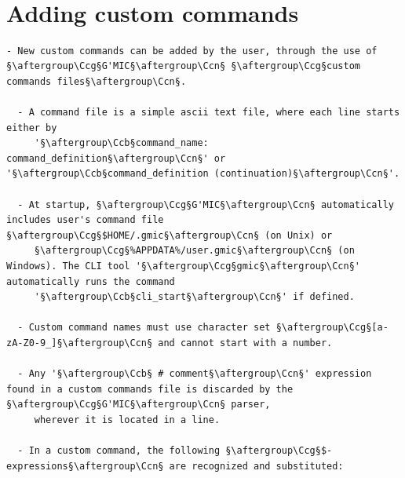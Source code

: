 \documentclass[a4paper,10.5pt,twoside]{book}
\def\Ccb{\color{cb}}
\def\Ccg{\color{cc}}
\def\Ccn{\color{black}}
\begin{document}
\normalsize
~\\\section{Adding custom commands}
\small
\begin{lstlisting}[escapechar=§]
  - New custom commands can be added by the user, through the use of §\aftergroup\Ccg§G'MIC§\aftergroup\Ccn§ §\aftergroup\Ccg§custom commands files§\aftergroup\Ccn§. 
 
  - A command file is a simple ascii text file, where each line starts either by 
     '§\aftergroup\Ccb§command_name: command_definition§\aftergroup\Ccn§' or '§\aftergroup\Ccb§command_definition (continuation)§\aftergroup\Ccn§'. 
 
  - At startup, §\aftergroup\Ccg§G'MIC§\aftergroup\Ccn§ automatically includes user's command file §\aftergroup\Ccg§$HOME/.gmic§\aftergroup\Ccn§ (on Unix) or 
     §\aftergroup\Ccg§%APPDATA%/user.gmic§\aftergroup\Ccn§ (on Windows). The CLI tool '§\aftergroup\Ccg§gmic§\aftergroup\Ccn§' automatically runs the command 
     '§\aftergroup\Ccb§cli_start§\aftergroup\Ccn§' if defined. 
 
  - Custom command names must use character set §\aftergroup\Ccg§[a-zA-Z0-9_]§\aftergroup\Ccn§ and cannot start with a number. 
 
  - Any '§\aftergroup\Ccb§ # comment§\aftergroup\Ccn§' expression found in a custom commands file is discarded by the §\aftergroup\Ccg§G'MIC§\aftergroup\Ccn§ parser, 
     wherever it is located in a line. 
 
  - In a custom command, the following §\aftergroup\Ccg§$-expressions§\aftergroup\Ccn§ are recognized and substituted: 
 

\end{lstlisting}
\end{document}
